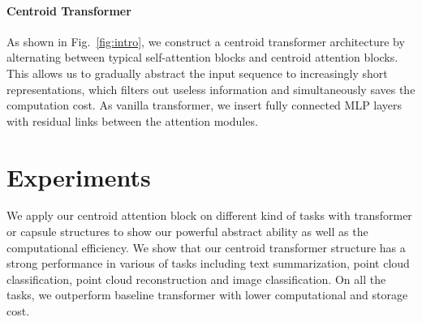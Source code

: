 \documentclass[english]{article}
\begin{document}
\paragraph{Centroid Transformer} 
As shown in Fig.~\ref{fig:intro},
 we construct a centroid transformer architecture by alternating between typical self-attention blocks and centroid attention blocks. 
This allows us to gradually abstract the input sequence to increasingly short representations, which filters out useless  information and simultaneously saves the computation cost. 
 As vanilla transformer, we insert 
fully connected  MLP layers 
with residual links
between the attention modules.   
















































%
 
\section{Experiments}


We apply our centroid attention block
on different kind of tasks with transformer or capsule structures to show our powerful abstract ability as well as the computational efficiency. We show that our centroid transformer structure has a strong performance in various of tasks including text summarization, point cloud classification, point cloud reconstruction and image classification. On all the tasks, we outperform baseline transformer with lower computational and storage cost.
\end{document}
